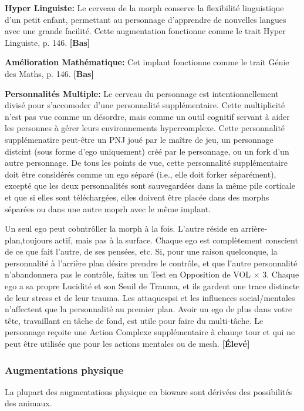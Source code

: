 \textbf{Hyper Linguiste:} Le cerveau de la morph conserve la flexibilité linguistique d'un petit enfant, permettant au personnage d'apprendre de nouvelles langues avec une grande facilité. Cette augmentation fonctionne comme le trait Hyper Linguiste, p. 146. \textbf{[Bas]} 

\textbf{Amélioration Mathématique:} Cet implant fonctionne comme le trait Génie des Maths, p. 146. \textbf{[Bas]} 

\textbf{Personnalités Multiple:} Le cerveau du personnage est intentionnellement divisé pour s'accomoder d'une personnalité supplémentaire. Cette multiplicité n'est pas vue comme un désordre, mais comme un outil cognitif servant à aider les personnes à gérer leurs environnements hypercomplexe. Cette personnalité supplémenatire peut-être un PNJ joué par le maître de jeu, un personnage distcint (sous forme d'ego uniquement) créé par le personnage, ou un fork d'un autre personnage. De tous les points de vue, cette personnalité supplémentaire doit être considérés comme un ego séparé (i.e., elle doit forker séparément), excepté que les deux personnalités sont sauvegardées dans la même pile corticale et que si elles sont téléchargées, elles doivent être placée dans des morphs séparées ou dans une autre moprh avec le même implant. 

Un seul ego peut cobntrôller la morph à la fois. L'autre réside en arrière-plan,toujours actif, mais pas à la surface. Chaque ego est complètement conscient de ce que fait l'autre, de ses pensées, etc. Si, pour une raison quelconque, la personnalité à l'arrière plan désire prendre le contrôle, et que l'autre personnalité n'abandonnera pas le contrôle, faites un Test en Opposition de VOL $\times$ 3. Chaque ego a sa propre Lucidité et son Seuil de Trauma, et ils gardent une trace distincte de leur stress et de leur trauma. Les attaquespsi et les influences social/mentales n'affectent que la personnalité au premier plan. Avoir un ego de plus dans votre tête, travaillant en tâche de fond, est utile pour faire du multi-tâche. Le personnage reçoite une Action Complexe supplémentaire à chauqe tour et qui ne peut être utilisée que pour les actions mentales ou de mesh. \textbf{[Élevé]} 

\subsubsection{Augmentations physique} 

La plupart des augmentations physique en bioware sont dérivées des possibilités des animaux. 

